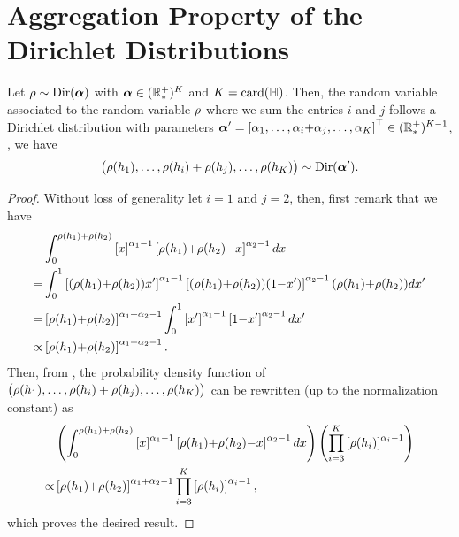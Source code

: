 \begin{noaddcontents}
\begin{algorithm}[h!]
\begin{algorithmic}
    \State{$\Q \leftarrow \P$}
    \EndFor
    \EndFor 
  \end{algorithmic}
  \label{chap:mv-sto:algo:lacasse}
\end{algorithm}

\section{Aggregation Property of the Dirichlet Distributions}

\begin{lemma}\label{ap:mv-sto:lemma:aggreg}
Let $\rho \sim \textrm{Dir}(\boldsymbol{\alpha})$ with $\boldsymbol{\alpha}\in(\mathbb{R}_{*}^+)^{K}$ and $K=\operatorname{card}(\mathbb{H})$.
Then, the random variable associated to the random variable $\rho$ where we sum the entries $i$ and $j$ follows a Dirichlet distribution with parameters $\displaystyle\boldsymbol{\alpha}'=\left[ \alpha_1,\dots, \alpha_i{+}\alpha_j, \dots, \alpha_{K} \right]^\top \in (\mathbb{R}_{*}^+)^{K-1}$, \ie, we have
\begin{align*}
    \big(\rho(h_1),\dots, \rho(h_i)+\rho(h_j), \dots, \rho(h_{K}) \big) \sim \textrm{Dir}(\boldsymbol{\alpha}').
\end{align*}
\end{lemma}
\begin{proof}
Without loss of generality let $i=1$ and $j=2$, then, first remark that we have
\begin{align}
    &\int_{0}^{\rho(h_1)+\rho(h_2)}\left[ x \right]^{\alpha_1-1}\left[\rho(h_1){+}\rho(h_2){-}x\right]^{\alpha_2-1}dx\nonumber\\
    = &\int_{0}^{1}\left[ (\rho(h_1){+}\rho(h_2))x' \right]^{\alpha_1-1}\left[(\rho(h_1){+}\rho(h_2))(1{-}x')\right]^{\alpha_2-1}(\rho(h_1){+}\rho(h_2))dx'\nonumber\\
    = &\left[\rho(h_1){+}\rho(h_2)\right]^{\alpha_1+\alpha_2-1}\int_{0}^{1}\left[ x' \right]^{\alpha_1-1}\left[1{-}x'\right]^{\alpha_2-1}dx'\nonumber\\
    \propto &\left[\rho(h_1){+}\rho(h_2)\right]^{\alpha_1+\alpha_2-1}.\label{ap:mv-sto:eq:aggreg-proof-1}
\end{align}
Then, from , the probability density function of $\big(\rho(h_1),\dots, \rho(h_i)+\rho(h_j), \dots, \rho(h_{K}) \big)$ can be rewritten (up to the normalization constant) as 
\begin{align*}
&\left(\int_{0}^{\rho(h_1)+\rho(h_2)}\left[ x \right]^{\alpha_1-1}\left[\rho(h_1){+}\rho(h_2){-}x\right]^{\alpha_2-1}dx\right)\left(\prod_{i=3}^{K} \left[ \rho(h_i)\right]^{\alpha_i-1}\right)\\
\propto &\left[\rho(h_1){+}\rho(h_2)\right]^{\alpha_1+\alpha_2-1}\prod_{i=3}^{K} \left[ \rho(h_i)\right]^{\alpha_i-1},
\end{align*}
which proves the desired result.
\end{proof}


\end{noaddcontents}
